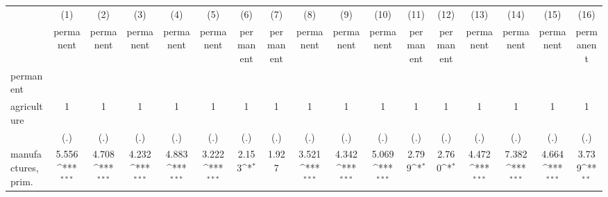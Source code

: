 {
\def\sym#1{\ifmmode^{#1}\else\(^{#1}\)\fi}
\begin{tabular}{l*{16}{c}}
\hline\hline
                    &\multicolumn{1}{c}{(1)}&\multicolumn{1}{c}{(2)}&\multicolumn{1}{c}{(3)}&\multicolumn{1}{c}{(4)}&\multicolumn{1}{c}{(5)}&\multicolumn{1}{c}{(6)}&\multicolumn{1}{c}{(7)}&\multicolumn{1}{c}{(8)}&\multicolumn{1}{c}{(9)}&\multicolumn{1}{c}{(10)}&\multicolumn{1}{c}{(11)}&\multicolumn{1}{c}{(12)}&\multicolumn{1}{c}{(13)}&\multicolumn{1}{c}{(14)}&\multicolumn{1}{c}{(15)}&\multicolumn{1}{c}{(16)}\\
                    &\multicolumn{1}{c}{permanent}&\multicolumn{1}{c}{permanent}&\multicolumn{1}{c}{permanent}&\multicolumn{1}{c}{permanent}&\multicolumn{1}{c}{permanent}&\multicolumn{1}{c}{permanent}&\multicolumn{1}{c}{permanent}&\multicolumn{1}{c}{permanent}&\multicolumn{1}{c}{permanent}&\multicolumn{1}{c}{permanent}&\multicolumn{1}{c}{permanent}&\multicolumn{1}{c}{permanent}&\multicolumn{1}{c}{permanent}&\multicolumn{1}{c}{permanent}&\multicolumn{1}{c}{permanent}&\multicolumn{1}{c}{permanent}\\
\hline
permanent           &                     &                     &                     &                     &                     &                     &                     &                     &                     &                     &                     &                     &                     &                     &                     &                     \\
agriculture         &           1         &           1         &           1         &           1         &           1         &           1         &           1         &           1         &           1         &           1         &           1         &           1         &           1         &           1         &           1         &           1         \\
                    &         (.)         &         (.)         &         (.)         &         (.)         &         (.)         &         (.)         &         (.)         &         (.)         &         (.)         &         (.)         &         (.)         &         (.)         &         (.)         &         (.)         &         (.)         &         (.)         \\
[1em]
manufactures, prim. &       5.556\sym{***}&       4.708\sym{***}&       4.232\sym{***}&       4.883\sym{***}&       3.222\sym{***}&       2.153\sym{*}  &       1.927         &       3.521\sym{***}&       4.342\sym{***}&       5.069\sym{***}&       2.799\sym{*}  &       2.760\sym{*}  &       4.472\sym{***}&       7.382\sym{***}&       4.664\sym{***}&       3.739\sym{**} \\

\end{tabular}}
